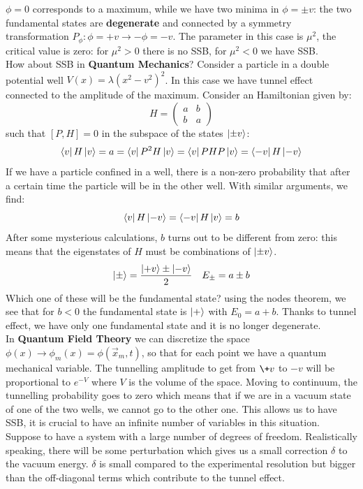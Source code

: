 \documentclass[../main.tex]{subfiles}
\begin{document}
$\phi=0$ corresponds to a maximum, while we have two minima in $\phi=\pm v$: the two fundamental states are \textbf{degenerate} and connected by a symmetry transformation $P_\phi: \phi=+v\to-\phi=-v$. The parameter in this case is $\mu^2$, the critical value is zero: for $\mu^2>0$ there is no SSB, for $\mu^2<0$ we have SSB.\\
How about SSB in \textbf{Quantum Mechanics}? Consider a particle in a double potential well $V(x)=\lambda(x^2-v^2)^2$. In this case we have tunnel effect connected to the amplitude of the maximum. Consider an Hamiltonian given by:
\[
H=\left(\begin{array}{cc}
    a & b \\
    b & a
\end{array}\right)
\]
such that $[P,H]=0$ in the subspace of the states $\ket{\pm v}$:
\[
\bra{v}H\ket{v}=a=\bra{v}P^2H\ket{v}=\bra{v}PHP\ket{v}=\bra{-v}H\ket{-v}
\]
If we have a particle confined in a well, there is a non-zero probability that after a certain time the particle will be in the other well. With similar arguments, we find:
\[
\bra{v}H\ket{-v}=\bra{-v}H\ket{v}=b
\]
After some mysterious calculations, $b$ turns out to be different from zero: this means that the eigenstates of $H$ must be combinations of $\ket{\pm v}$.
\[
\ket{\pm}=\frac{\ket{+v}\pm\ket{-v}}{2} \quad E_\pm=a\pm b
\]
Which one of these will be the fundamental state? using the nodes theorem, we see that for $b<0$ the fundamental state is $\ket{+}$ with $E_0=a+b$. Thanks to tunnel effect, we have only one fundamental state and it is no longer degenerate.\\
In \textbf{Quantum Field Theory} we can discretize the space\\
$\phi(x)\to\phi_m(x)=\phi(\Vec{x}_m,t)$, so that for each point we have a quantum mechanical variable. The tunnelling amplitude to get from $\+v$ to $-v$ will be proportional to $e^{-V}$ where $V$ is the volume of the space. Moving to continuum, the tunnelling probability goes to zero which means that if we are in a vacuum state of one of the two wells, we cannot go to the other one. This allows us to have SSB, it is crucial to have an infinite number of variables in this situation.\\
Suppose to have a system with a large number of degrees of freedom. Realistically speaking, there will be some perturbation which gives us a small correction $\delta$ to the vacuum energy. $\delta$ is small compared to the experimental resolution but bigger than the off-diagonal terms which contribute to the tunnel effect. 
\end{document}
